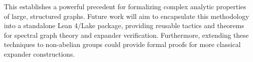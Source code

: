 \documentclass[11pt, a4paper]{article}
\theoremstyle{definition}
\begin{document}
This establishes a powerful precedent for formalizing complex analytic properties of large, structured graphs. Future work will aim to encapsulate this methodology into a standalone Lean 4/Lake package, providing reusable tactics and theorems for spectral graph theory and expander verification. Furthermore, extending these techniques to non-abelian groups could provide formal proofs for more classical expander constructions.



\end{document}
